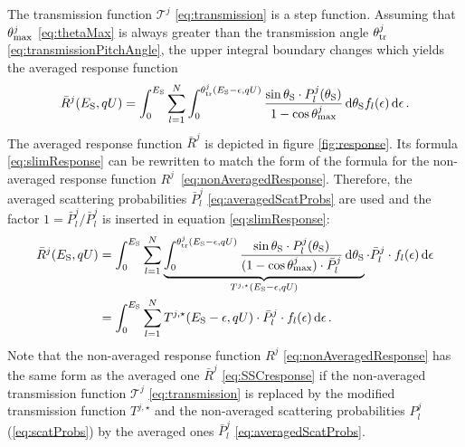 The transmission function $\mathcal{T}^j$ \eqref{eq:transmission} is a step function. Assuming that $\theta_\mathrm{max}^j$ \eqref{eq:thetaMax} is always greater than the transmission angle $\theta^j_\mathrm{tr}$ \eqref{eq:transmissionPitchAngle}, the upper integral boundary changes which yields the averaged response function
\begin{equation}
    \label{eq:slimResponse}
    \bar{R}^j(E_\mathrm{S}, qU) =
    \int_0^{E_\mathrm{S}}
        \sum_{l=1}^{N}
            \int_{0}^{\theta^j_\mathrm{tr}(E_\mathrm{S}-\epsilon, qU)}
            \frac{
                \sin\theta_\mathrm{S} \cdot P^j_l(\theta_\mathrm{S})
            }{
                1-\cos\theta_\mathrm{max}^j
            }
            \mathop{}\!\mathrm{d} \theta_\mathrm{S}
            f_l(\epsilon)
    \mathop{}\!\mathrm{d} \epsilon
    \text{\,.}
\end{equation}
The averaged response function $\bar{R}^j$ is depicted in figure \ref{fig:response}. Its formula \eqref{eq:slimResponse} can be rewritten to match the form of the formula for the non-averaged response function \mbox{$R^j$ \eqref{eq:nonAveragedResponse}}. Therefore, the averaged scattering probabilities $\bar{P}^j_l$ \eqref{eq:averagedScatProbs} are used and the factor $1 = \bar{P}^j_l / \bar{P}^j_l$ is inserted in equation \eqref{eq:slimResponse}:
\begin{align}
    \label{eq:implementedResponse}
    \bar{R}^j(E_\mathrm{S}, qU) &=
    \int_0^{E_\mathrm{S}}
        \sum_{l=1}^{N}
            \underbrace{
                \int_{0}^{\theta^j_\mathrm{tr}(E_\mathrm{S}-\epsilon, qU)}
                \frac{
                    \sin\theta_\mathrm{S} \cdot P^j_l(\theta_\mathrm{S})
                }{
                    (1-\cos\theta_\mathrm{max}^j) \cdot \bar{P}^j_l
                }
                \mathop{}\!\mathrm{d} \theta_\mathrm{S}
            }_{
                T^{j,\star}(E_\mathrm{S}-\epsilon, qU)
            } \cdot 
            \bar{P}^j_l \cdot
            f_l(\epsilon)
    \mathop{}\!\mathrm{d} \epsilon \\ &=
    \int_0^{E_\mathrm{S}}
        \sum_{l=1}^{N}
            T^{j,\star}(E_\mathrm{S}-\epsilon, qU) \cdot 
            \bar{P}^j_l \cdot
            f_l(\epsilon)
    \mathop{}\!\mathrm{d} \epsilon
    \label{eq:SSCresponse}
    \text{\,.}
\end{align}
Note that the non-averaged response function $R^j$ \eqref{eq:nonAveragedResponse} has the same form as the averaged one $\bar{R}^j$ \eqref{eq:SSCresponse} if the non-averaged transmission function $\mathcal{T}^j$ \eqref{eq:transmission} is replaced by the modified transmission function $T^{j,\star}$ and the non-averaged scattering probabilities $P^j_l$ (\ref{eq:scatProbs}) by the averaged ones $\bar{P}^j_l$ \eqref{eq:averagedScatProbs}.

